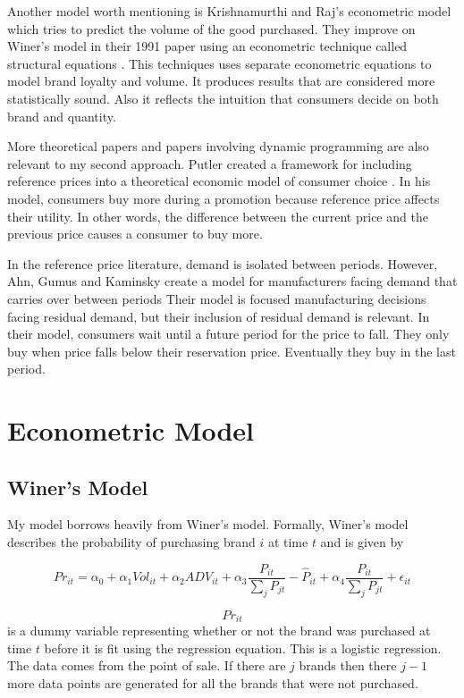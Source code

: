 \documentclass{article}
\begin{document}
Another model worth mentioning is Krishnamurthi and Raj's econometric model which tries to predict the volume of the good purchased. They improve on Winer's model in their 1991 paper using an econometric technique called structural equations \cite{krishnamurthi}. This techniques uses separate econometric equations to model brand loyalty and volume. It produces results that are considered more statistically sound. Also it reflects the intuition that consumers decide on both brand and quantity.

More theoretical papers and papers involving dynamic programming are also relevant to my second approach. Putler created a framework for including reference prices into a theoretical economic model of consumer choice \cite{putler}. In his model, consumers buy more during a promotion because reference price affects their utility. In other words, the difference between the current price and the previous price causes a consumer to buy more.

In the reference price literature, demand is isolated between periods. However, Ahn, Gumus and Kaminsky create a model for manufacturers facing demand that carries over between periods \cite{ahn} Their model is focused manufacturing decisions facing residual demand, but their inclusion of residual demand is relevant. In their model, consumers wait until a future period for the price to fall. They only buy when price falls below their reservation price. Eventually they buy in the last period.

\section{Econometric Model}

\subsection{Winer's Model}
My model borrows heavily from Winer's model. Formally, Winer's model describes the probability of purchasing brand $i$ at time $t$ and is given by

$$ {Pr}_{it} = \alpha_0 + \alpha_1 Vol_{it} + \alpha_2 ADV_{it} +  \alpha_3 \dfrac{P_{it}} {\sum_j P_{jt}} - \hat{P}_{it}+ \alpha_4 \dfrac {P_{it}}{\sum_j P_{jt}} + \epsilon_{it}$$

$${Pr}_{it}$$ is a dummy variable representing whether or not the brand was purchased at time $t$ before it is fit using the regression equation. This is a logistic regression. The data comes from the point of sale. If there are $j$ brands then there $j-1$ more data points are generated for all the brands that were not purchased.
\end{document}
